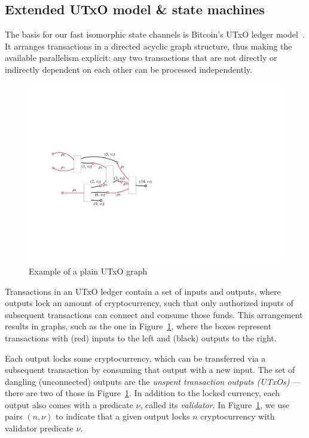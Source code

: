 \subsection{Extended UTxO model \& state machines}
\label{sec:prel_tx}

The basis for our fast isomorphic state channels is Bitcoin's UTxO ledger model~\cite{formal-model-of-bitcoin-transactions,Zahnentferner18-UTxO}. It arranges transactions in a directed acyclic graph structure, thus making the available parallelism explicit: any two transactions that are not directly or indirectly dependent on each other can be processed independently. 

\begin{figure}[t]
  \centering
  \includegraphics[scale=.2,width=\textwidth/2]{figures/utxo-graph.pdf}
  \caption{Example of a plain UTxO graph}
  \label{fig:utxo-graph}
\end{figure}
%
Transactions in an UTxO ledger contain a set of inputs and outputs, where outputs lock an amount of cryptocurrency, such that only authorized inputs of subsequent transactions can connect and consume those funds. This arrangement results in graphs, such as the one in Figure~\ref{fig:utxo-graph}, where the boxes represent transactions with (red) inputs to the left and (black) outputs to the right.

Each output locks some cryptocurrency, which can be transferred via a subsequent transaction by consuming that output with a new input. The set of dangling (unconnected) outputs are the \emph{unspent transaction outputs (UTxOs)} --- there are two of those in Figure~\ref{fig:utxo-graph}. In addition to the locked currency, each output also comes with a predicate $\nu$, called its \emph{validator}. In Figure~\ref{fig:utxo-graph}, we use pairs \((n, \nu)\) to indicate that a given output locks $n$ cryptocurrency with validator predicate $\nu$.

